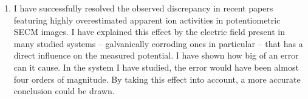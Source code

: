 \begin{enumerate}
\item I have successfully resolved the observed discrepancy in recent papers featuring highly overestimated apparent ion activities in potentiometric SECM images.
I have explained this effect by the electric field present in many studied systems -- galvanically corroding ones in particular -- that has a direct influence on the measured potential.
I have shown how big of an error can it cause.
In the system I have studied, the error would have been almost four orders of magnitude.
By taking this effect into account, a more accurate conclusion could be drawn.

\end{enumerate}
